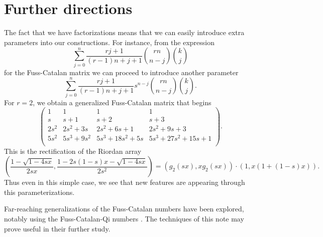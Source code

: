 \documentclass[12pt,reqno]{article}
\theoremstyle{definition}
\begin{document}
\section{Further directions}
The fact that we have factorizations means that we can easily introduce extra parameters into our constructions. For instance, from the expression
$$\sum_{j=0}^n \frac{rj+1}{(r-1)n+j+1} \binom{rn}{n-j}\binom{k}{j}$$ for the Fuss-Catalan matrix we can proceed to introduce another parameter
$$\sum_{j=0}^n \frac{rj+1}{(r-1)n+j+1}s^{n-j} \binom{rn}{n-j}\binom{k}{j}.$$
For $r=2$, we obtain a generalized Fuss-Catalan matrix that begins
$$\left(
\begin{array}{cccc}
 1 & 1 & 1 & 1  \\
 s & s+1 & s+2 & s+3  \\
 2s^2 & 2s^2+3s & 2s^2+6s+1 & 2s^2+9s+3  \\
 5s^2 & 5s^3+9s^2 & 5s^3+18s^2+5s & 5s^3+27s^2+15s+1  \\
\end{array}\right).$$
This is the rectification of the Riordan array
$$\left(\frac{1-\sqrt{1-4sx}}{2sx}, \frac{1-2s(1-s)x-\sqrt{1-4sx}}{2s^2}\right)=(g_2(sx), xg_2(sx))\cdot (1,x(1+(1-s)x)).$$
Thus even in this simple case, we see that new features are appearing through this parameterizations.

Far-reaching generalizations of the Fuss-Catalan numbers have been explored, notably using the Fuss-Catalan-Qi numbers \cite{Qi1}. The techniques of this note may prove useful in their further study.
\end{document}
